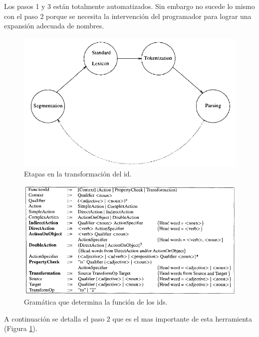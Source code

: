 \documentclass[12pt]{report}
\begin{document}
Los pasos 1 y 3 están totalmente automatizados. Sin embargo no sucede lo mismo con el paso 2 porque se necesita la intervención del programador para lograr una expansión adecuada de nombres.

\begin{figure}[h] %
\centering
\includegraphics[scale= 0.60]{./ire_2.png}
\caption{Etapas en la transformación del id.}
\label{ire2}
\end{figure}

\begin{figure}[t] %
\centering
\includegraphics[scale= 0.70]{./ire_3.png}
\caption{Gramática que determina la función de los ids.}
\label{ire3}
\end{figure}

A continuación se detalla el paso 2 que es el mas importante de esta herramienta (Figura \ref{ire2}).
\end{document}
